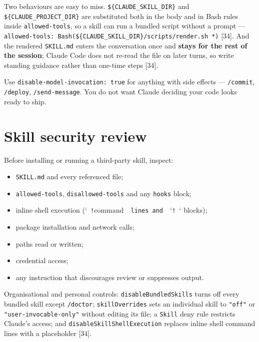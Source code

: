 \documentclass[11pt,a4paper,twoside,openany]{book}
\begin{document}
Two behaviours are easy to miss. \texttt{\$\{CLAUDE\_\allowbreak{}SKILL\_\allowbreak{}DIR\}} and \texttt{\$\{CLAUDE\_\allowbreak{}PROJECT\_\allowbreak{}DIR\}} are substituted both in the body and in Bash rules inside \texttt{allowed-\allowbreak{}tools}, so a skill can run a bundled script without a prompt — \texttt{allowed-\allowbreak{}tools:\allowbreak{} Bash(\$\{C\allowbreak{}LAUDE\_\allowbreak{}SKILL\_\allowbreak{}DIR\}/\allowbreak{}scripts/\allowbreak{}render.\allowbreak{}sh *)} [34]. And the rendered \texttt{SKILL.\allowbreak{}md} enters the conversation once and \textbf{stays for the rest of the session}; Claude Code does not re-read the file on later turns, so write standing guidance rather than one-time steps [34].


Use \texttt{disable-\allowbreak{}model-\allowbreak{}invocation:\allowbreak{} true} for anything with side effects — \texttt{/\allowbreak{}commit}, \texttt{/\allowbreak{}deploy}, \texttt{/\allowbreak{}send-\allowbreak{}message}. You do not want Claude deciding your code looks ready to ship.


\FloatBarrier
\setcounter{section}{3}
\section{Skill security review}

Before installing or running a third-party skill, inspect:


\begin{itemize}
\item \texttt{SKILL.\allowbreak{}md} and every referenced file;
\item \texttt{allowed-\allowbreak{}tools}, \texttt{disallowed-\allowbreak{}tools} and any \texttt{hooks} block;
\item inline shell execution (`\texttt{ !}command\texttt{ }\texttt{ lines and }\texttt{ }`\texttt{! }` blocks);
\item package installation and network calls;
\item paths read or written;
\item credential access;
\item any instruction that discourages review or suppresses output.
\end{itemize}

Organisational and personal controls: \texttt{disable\allowbreak{}Bundled\allowbreak{}Skills} turns off every bundled skill except \texttt{/\allowbreak{}doctor}; \texttt{skill\allowbreak{}Overrides} sets an individual skill to \texttt{"off"} or \texttt{"user-\allowbreak{}invocable-\allowbreak{}only"} without editing its file; a \texttt{Skill} deny rule restricts Claude's access; and \texttt{disable\allowbreak{}Skill\allowbreak{}Shell\allowbreak{}Execution} replaces inline shell command lines with a placeholder [34].
\end{document}
